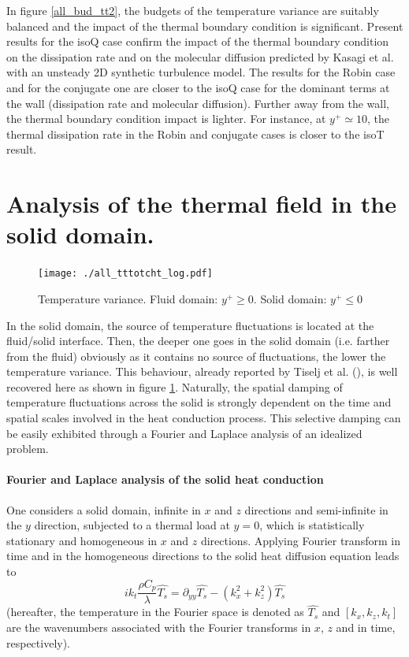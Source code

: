 \documentclass[review]{elsarticle}
\begin{document}
In figure \ref{all_bud_tt2}, the budgets of the temperature variance are suitably balanced and the impact of the thermal boundary condition is significant. Present results for the isoQ case confirm the impact of the thermal boundary condition on the dissipation rate and on the molecular diffusion predicted by Kasagi et al. \cite{kasagi1989numerical} with an unsteady 2D synthetic turbulence model. The results for the Robin case and for the conjugate one are closer to the isoQ case for the dominant terms at the wall (dissipation rate and molecular diffusion). Further away from the wall, the thermal boundary condition impact is lighter. For instance, at $y^+ \simeq 10$, the thermal dissipation rate in the Robin and conjugate cases is closer to the isoT result.

\section{Analysis of the thermal field in the solid domain.}

\begin{figure}[htbp]
\centering
\texttt{[image: ./all\_tttotcht\_log.pdf]}
\caption{Temperature variance. Fluid domain: $y^+ \ge 0 $. Solid domain: $y^+ \le 0$}
\label{all_tt_tot}
\end{figure}

In the solid domain, the source of temperature fluctuations is located at the fluid/solid interface. Then, the deeper one goes in the solid domain (i.e. farther from the fluid) obviously as it contains no source of fluctuations, the lower the temperature variance. This behaviour, already reported by Tiselj et al. (\cite{Tiselj2001dns}), is well recovered here as shown in figure \ref{all_tt_tot}. Naturally, the spatial damping of temperature fluctuations across the solid is strongly dependent on the time and spatial scales involved in the heat conduction process. This selective damping can be easily exhibited through a Fourier and Laplace analysis of an idealized problem.

\paragraph{Fourier and Laplace analysis of the solid heat conduction} One considers a solid domain, infinite in $x$ and $z$ directions and semi-infinite in the $y$ direction, subjected to a thermal load at $y=0$, which is statistically stationary and homogeneous in $x$ and $z$ directions. Applying Fourier transform in time and in the homogeneous directions to the solid heat diffusion equation leads to %
\begin{equation}\label{fourier}
ik_t \frac{\rho C_p}{\lambda} \widehat{T_s} = \partial_{yy} \widehat{T_s} - \left( k_x^2 + k_z^2 \right) \widehat{T_s}
\end{equation}
(hereafter, the temperature in the Fourier space is denoted as $\widehat{T_s}$ and $[k_x,k_z,k_t]$ are the wavenumbers associated with the Fourier transforms in $x$, $z$ and in time, respectively).
\end{document}
